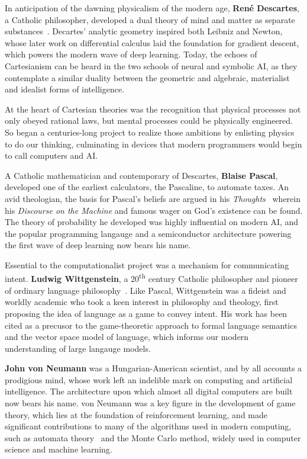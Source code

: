 \documentclass[sigplan,nonacm]{acmart}\settopmatter{printfolios=false,printccs=false,printacmref=false}
\begin{document}
  In anticipation of the dawning physicalism of the modern age, \textbf{Ren\'e Descartes}, a Catholic philosopher, developed a dual theory of mind and matter as separate substances~\cite{descartes1641meditationes}. Decartes' analytic geometry inspired both Leibniz and Newton, whose later work on differential calculus laid the foundation for gradient descent, which powers the modern wave of deep learning. Today, the echoes of Cartesianism can be heard in the two schools of neural and symbolic AI, as they contemplate a similar duality between the geometric and algebraic, materialist and idealist forms of intelligence.

  At the heart of Cartesian theories was the recognition that physical processes not only obeyed rational laws, but mental processes could be physically engineered. So began a centuries-long project to realize those ambitions by enlisting physics to do our thinking, culminating in devices that modern programmers would begin to call computers and AI.

  A Catholic mathematician and contemporary of Descartes, \textbf{Blaise Pascal}, developed one of the earliest calculators, the Pascaline, to automate taxes. An avid theologian, the basis for Pascal's beliefs are argued in his \textit{Thoughts}~\cite{pascal1670pensees} wherein his \textit{Discourse on the Machine} and famous wager on God's existence can be found. The theory of probability he developed was highly influential on modern AI, and the popular programming langauge and a semiconductor architecture powering the first wave of deep learning now bears his name.

  Essential to the computationalist project was a mechanism for communicating intent. \textbf{Ludwig Wittgenstein}, a 20\textsuperscript{th} century Catholic philosopher and pioneer of ordinary language philosophy~\cite{wittgenstein1929some}. Like Pascal, Wittgenstein was a fideist and worldly academic who took a keen interest in philosophy and theology, first proposing the idea of language as a game to convey intent. His work has been cited as a precusor to the game-theoretic approach to formal language semantics and the vector space model of language, which informs our modern understanding of large langauge models.

  \textbf{John von Neumann} was a Hungarian-American scientist, and by all accounts a prodigious mind, whose work left an indelible mark on computing and artificial intelligence. The architecture upon which almost all digital computers are built now bears his name. von Neumann was a key figure in the development of game theory, which lies at the foundation of reinforcement learning, and made significant contributions to many of the algorithms used in modern computing, such as automata theory~\cite{von2017general} and the Monte Carlo method, widely used in computer science and machine learning.
\end{document}

